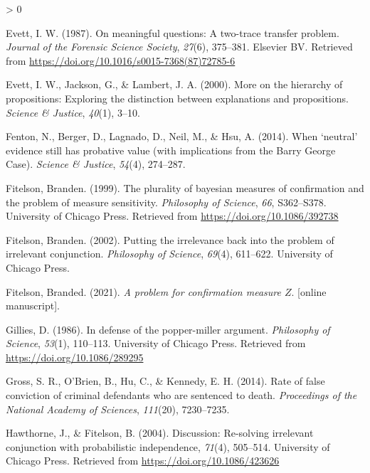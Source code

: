 \documentclass[
  10pt,
  dvipsnames,enabledeprecatedfontcommands]{scrartcl}
\newlength{\cslhangindent}
\newenvironment{CSLReferences}[2] %
 {%
  \setlength{\parindent}{0pt}
  \ifodd #1 \everypar{\setlength{\hangindent}{\cslhangindent}}\ignorespaces\fi
  \ifnum #2 > 0
  \setlength{\parskip}{#2\baselineskip}
  \fi
 }%
 {}
\begin{document}
\begin{CSLReferences}{1}{0}
\leavevmode\hypertarget{ref-Evett1987}{}%
Evett, I. W. (1987). On meaningful questions: A two-trace transfer
problem. \emph{Journal of the Forensic Science Society}, \emph{27}(6),
375--381. Elsevier {BV}. Retrieved from
\url{https://doi.org/10.1016/s0015-7368(87)72785-6}

\leavevmode\hypertarget{ref-evett2000MoreHierarchyPropositions}{}%
Evett, I. W., Jackson, G., \& Lambert, J. A. (2000). More on the
hierarchy of propositions: Exploring the distinction between
explanations and propositions. \emph{Science \& Justice}, \emph{40}(1),
3--10.

\leavevmode\hypertarget{ref-fenton2014WhenNeutralEvidence}{}%
Fenton, N., Berger, D., Lagnado, D., Neil, M., \& Hsu, A. (2014). When
{`neutral'} evidence still has probative value (with implications from
the {Barry George Case}). \emph{Science \& Justice}, \emph{54}(4),
274--287.

\leavevmode\hypertarget{ref-Fitelson1999plurality}{}%
Fitelson, Branden. (1999). The plurality of bayesian measures of
confirmation and the problem of measure sensitivity. \emph{Philosophy of
Science}, \emph{66}, S362--S378. University of Chicago Press. Retrieved
from \url{https://doi.org/10.1086/392738}

\leavevmode\hypertarget{ref-Fitelson2002irrelevance}{}%
Fitelson, Branden. (2002). Putting the irrelevance back into the problem
of irrelevant conjunction. \emph{Philosophy of Science}, \emph{69}(4),
611--622. University of Chicago Press.

\leavevmode\hypertarget{ref-Fitelson2021z_measure}{}%
Fitelson, Branded. (2021). \emph{A problem for confirmation measure
\(Z\)}. {[}online manuscript{]}.

\leavevmode\hypertarget{ref-Gillies1986defense}{}%
Gillies, D. (1986). In defense of the popper-miller argument.
\emph{Philosophy of Science}, \emph{53}(1), 110--113. University of
Chicago Press. Retrieved from \url{https://doi.org/10.1086/289295}

\leavevmode\hypertarget{ref-gross2014RateFalseConviction}{}%
Gross, S. R., O'Brien, B., Hu, C., \& Kennedy, E. H. (2014). Rate of
false conviction of criminal defendants who are sentenced to death.
\emph{Proceedings of the National Academy of Sciences}, \emph{111}(20),
7230--7235.

\leavevmode\hypertarget{ref-HawthorneFitelson2004re-solving}{}%
Hawthorne, J., \& Fitelson, B. (2004). Discussion: Re-solving irrelevant
conjunction with probabilistic independence, \emph{71}(4), 505--514.
University of Chicago Press. Retrieved from
\url{https://doi.org/10.1086/423626}


\end{CSLReferences}
\end{document}
